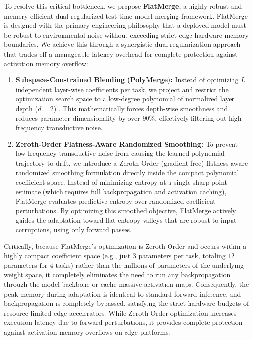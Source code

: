 To resolve this critical bottleneck, we propose \textbf{FlatMerge}, a highly robust and memory-efficient dual-regularized test-time model merging framework. 
FlatMerge is designed with the primary engineering philosophy that a deployed model must be robust to environmental noise without exceeding strict edge-hardware memory boundaries. 
We achieve this through a synergistic dual-regularization approach that trades off a manageable latency overhead for complete protection against activation memory overflow:
\begin{enumerate}
    \item \textbf{Subspace-Constrained Blending (PolyMerge):} Instead of optimizing $L$ independent layer-wise coefficients per task, we project and restrict the optimization search space to a low-degree polynomial of normalized layer depth ($d=2$) \cite{polymerge}. This mathematically forces depth-wise smoothness and reduces parameter dimensionality by over $90\%$, effectively filtering out high-frequency transductive noise.
    \item \textbf{Zeroth-Order Flatness-Aware Randomized Smoothing:} To prevent low-frequency transductive noise from causing the learned polynomial trajectory to drift, we introduce a Zeroth-Order (gradient-free) flatness-aware randomized smoothing formulation directly inside the compact polynomial coefficient space. Instead of minimizing entropy at a single sharp point estimate (which requires full backpropagation and activation caching), FlatMerge evaluates predictive entropy over randomized coefficient perturbations. By optimizing this smoothed objective, FlatMerge actively guides the adaptation toward flat entropy valleys that are robust to input corruptions, using only forward passes.
\end{enumerate}

Critically, because FlatMerge's optimization is Zeroth-Order and occurs within a highly compact coefficient space (e.g., just $3$ parameters per task, totaling $12$ parameters for $4$ tasks) rather than the millions of parameters of the underlying weight space, it completely eliminates the need to run any backpropagation through the model backbone or cache massive activation maps. Consequently, the peak memory during adaptation is identical to standard forward inference, and backpropagation is completely bypassed, satisfying the strict hardware budgets of resource-limited edge accelerators. While Zeroth-Order optimization increases execution latency due to forward perturbations, it provides complete protection against activation memory overflows on edge platforms.


